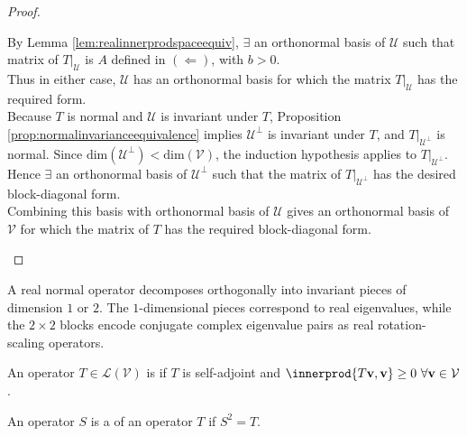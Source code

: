 \begin{theorem}
\begin{proof}
\begin{enumerate}[label=\roman*.]
By Lemma \ref{lem:realinnerprodspaceequiv}, $\exists$ an orthonormal basis of $\mathcal{U}$ such that matrix of $T|_{\mathcal{U}}$ is $A$ defined in $(\Leftarrow)$, with $b > 0$.\\
Thus in either case, $\mathcal{U}$ has an orthonormal basis for which the matrix $T|_{\mathcal{U}}$ has the required form.\\
Because $T$ is normal and $\mathcal{U}$ is invariant under $T$, Proposition \ref{prop:normalinvarianceequivalence} implies $\mathcal{U}^{\perp}$ is invariant under $T$, and $T|_{\mathcal{U}^{\perp}}$ is normal. Since $\text{dim}(\mathcal{U}^{\perp}) < \text{dim}(\mathcal{V})$, the induction hypothesis applies to $T|_{\mathcal{U}^{\perp}}$.\\
Hence $\exists$ an orthonormal basis of $\mathcal{U}^{\perp}$ such that the matrix of $T|_{\mathcal{U}^{\perp}}$ has the desired block-diagonal form.\\
Combining this basis with orthonormal basis of $\mathcal{U}$ gives an orthonormal basis of $\mathcal{V}$ for which the matrix of $T$ has the required block-diagonal form.
\end{enumerate}
\end{proof}
\end{theorem}

A real normal operator decomposes orthogonally into invariant pieces of dimension $1$ or $2$. The $1$-dimensional pieces correspond to real eigenvalues, while the $2 \times 2$ blocks encode conjugate complex eigenvalue pairs as real rotation-scaling operators.

\begin{definition} An operator $T \in \mathcal{L}(\mathcal{V})$ is  if $T$ is self-adjoint and $\innerprod{T \mathbf{v}, \mathbf{v}} \geq 0 \ \forall \mathbf{v} \in \mathcal{V}$.
\end{definition}

\begin{definition} An operator $S$ is a  of an operator $T$ if $S^2 = T$.
\end{definition}

